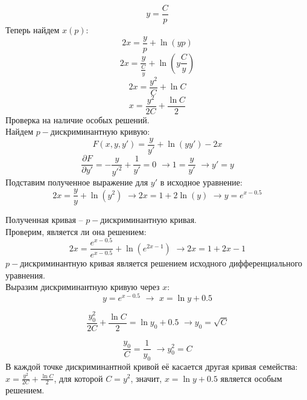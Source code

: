 \documentclass[a5paper, 10pt]{article}
\theoremstyle{definition}
\theoremstyle{plain}
\theoremstyle{remark}
\begin{document}
\begin{equation*}
 y   =   \frac{C}{p}
\end{equation*}
Теперь найдем $x(p)$:
\begin{equation*}
2x = \frac{y}{p} + \ln (yp)
\end{equation*}
\begin{equation*}
2x = \frac{ y}{ \frac{C}{y}} + \ln ( y  \frac{C}{y})
\end{equation*}
\begin{equation*}
2x = \frac{ y^2}{C} + \ln  C
\end{equation*}
\begin{equation*}
x = \frac{ y^2}{2C} +  \frac {\ln  C}{2}
\end{equation*}
Проверка на наличие особых решений.\\
Найдем $p-$дискриминантную кривую:
\begin{equation*}
F(x, y, y')= \frac{y}{y'}+\ln (yy') - 2x
\end{equation*}
\begin{equation*}
\frac{\partial F}{\partial y'} = - \frac{y}{y'^2} + \frac{1}{y'}  = 0 \, \, \to  1  =  \frac{y}{y'} \, \, \to y' = y
\end{equation*}
Подставим полученное выражение для $y'$ в исходное уравнение:
\begin{equation*}
2x = \frac{y}{y} + \ln (y^2) \, \, \to 2x = 1 + 2\ln (y) \, \, \to y = e^{x - 0.5}
\end{equation*}

Полученная кривая --  $p-$дискриминантную кривая.\\
Проверим, является ли она решением:
\begin{equation*}
2x = \frac{e^{x-0.5}}{e^{x- 0.5}} + \ln (e^{2x- 1}) \, \, \to 2x  = 1 + 2x - 1
\end{equation*}
$p-$дискриминантную кривая является решением исходного дифференциального уравнения.\\
Выразим дискриминантную кривую через $x$:
\begin{equation*}
 y = e^{x - 0.5} \, \, \to \, \,  x = \ln y + 0.5
\end{equation*}


\begin{equation*}
   \frac{ y_0^2}{2C} +  \frac {\ln  C}{2}  = \ln y_0 + 0.5 \, \, \to y_0 = \sqrt{ C}
\end{equation*}

\begin{equation*}
   \frac{ y_0}{C}   = \frac{1}{y_0} \, \, \to y_0^2 =  C
\end{equation*}
В каждой точке дискриминантной кривой её касается другая кривая семейства: $x = \frac{ y^2}{2C} +  \frac {\ln  C}{2}$, для которой $C=y^2$, значит, $x = \ln y + 0.5 $ является особым решением.\\
\end{document}
